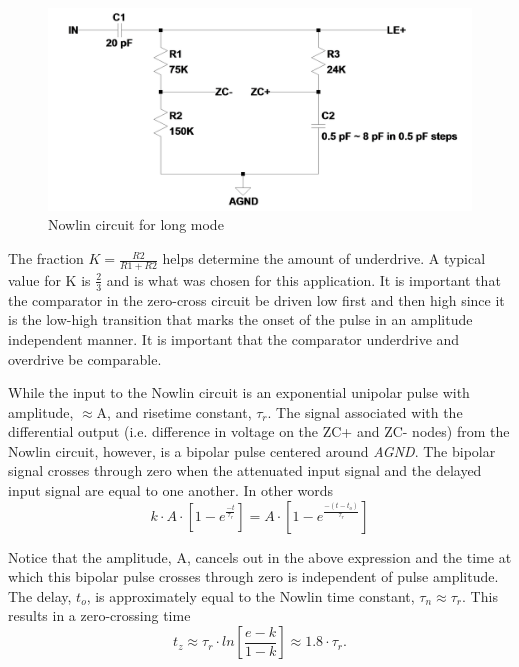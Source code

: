 \documentclass[12pt,oneside,final]{siuethesis}
\theoremstyle{definition}
\begin{document}
\begin{figure}[htbp!]
\centering
\includegraphics[scale=.27,keepaspectratio=true]{../LTspice_Drawings/nowlin/nowlin_long.png} 
\caption{Nowlin circuit for long mode}
\label{fig:Nowlinlong}
\end{figure}

\par The fraction $K = \frac{R2}{R1 + R2}$ helps determine the amount of underdrive. A typical value for K is $\frac{2}{3}$ and is what was chosen for this application. It is important that the comparator in the zero-cross circuit be driven low first and then high since it is the low-high transition that marks the onset of the pulse in an amplitude independent manner. It is important that the comparator underdrive and overdrive be comparable.
\par While the input to the Nowlin circuit is an exponential unipolar pulse with amplitude, $\approx$A, and risetime constant, $\tau_{r}$. The signal associated with the differential output (i.e. difference in voltage on the ZC+ and ZC- nodes) from the Nowlin circuit, however, is a bipolar pulse centered around \emph{AGND}. The bipolar signal crosses through zero when the attenuated input signal and the delayed input signal are equal to one another. In other words
\begin{equation}
k \cdot A \cdot \left[ 1 - e^{\frac{-t}{\tau_r}} \right] = A \cdot \left[ 1 - e^{\frac{-(t - t_o)}{\tau_r}} \right]
\end{equation}

Notice that the amplitude, A, cancels out in the above expression and the time at which this bipolar pulse crosses through zero is independent of pulse amplitude. The delay, $t_{o}$, is approximately equal to the Nowlin time constant, $\tau_{n} \approx \tau_{r}$. This results in a zero-crossing time
\begin{equation}
t_z \approx \tau_r \cdot ln \left[ \frac{e - k}{1-k}\right] \approx 1.8 \cdot \tau_r.
\end{equation}
\end{document}
